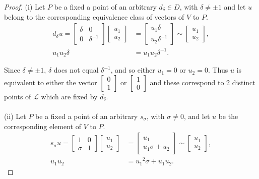 \begin{proof} 
(i) Let $P$ be a fixed a point of an arbitrary $d_\delta \in D$, with $\delta \neq \pm 1$ and let $u$ belong to the corresponding equivalence class of vectors of $V$ to $P$. \\
\begin{align*} d_\delta u = \begin{bmatrix} \delta & 0 \\ 0 & \delta^{-1} \end{bmatrix} \begin{bmatrix} u_1 \\ u_2 \end{bmatrix} &= \begin{bmatrix} u_1 \delta \\ u_2 \delta^{-1} \end{bmatrix} \sim \begin{bmatrix} u_1 \\ u_2 \end{bmatrix}, 
\\[1.5ex] u_1 u_2 \delta &= u_1 u_2 \delta^{-1}.
\end{align*}

Since $\delta \neq \pm 1$, $\delta$ does not equal $\delta^{-1}$, and so either $u_1 = 0$ or $u_2 = 0$. Thus $u$ is equivalent to either the vector $\begin{bmatrix} 0 \\ 1 \end{bmatrix}$ or $\begin{bmatrix} 1 \\ 0 \end{bmatrix}$ and these correspond to 2 distinct points of $\mathscr{L}$ which are fixed by $d_\delta$. \\
\\
(ii) Let $P$ be a fixed a point of an arbitrary $s_\sigma$, with $\sigma \neq 0$, and let $u$ be the corresponding element of $V$ to $P$. \\
\begin{align*} s_\sigma u = \begin{bmatrix} 1 & 0 \\ \sigma & 1 \end{bmatrix} \begin{bmatrix} u_1 \\ u_2 \end{bmatrix} &= \begin{bmatrix} u_1 \\ u_1 \sigma + u_2 \end{bmatrix} \sim \begin{bmatrix} u_1 \\ u_2 \end{bmatrix}, 
\\[1.5ex] u_1 u_2 &= {u_1}^2 \sigma + u_1 u_2.
\end{align*}


\end{proof}
